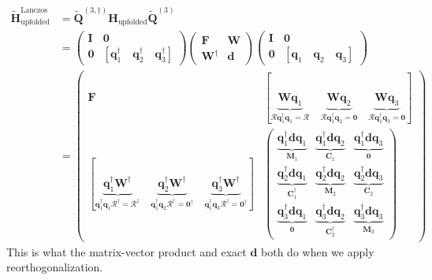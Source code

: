 \begin{align}
    \bm{\tilde{H}}_{\text{upfolded}}^{\text{Lanczos Iter 3}} &= \bm{\tilde{Q}}^{(3,\dagger)} \bm{H}_{\text{upfolded}} \bm{\tilde{Q}}^{(3)}\\
    &= \begin{pmatrix}
        \bm{I} & \bm{0} \\
        \bm{0} & [\bm{q}_1^{\dag}\quad \bm{q}_2^{\dag} \quad \bm{q}_3^{\dag}]
    \end{pmatrix}
    \begin{pmatrix}
        \bm{F} & \bm{W}\\
        \bm{W}^{\dagger} & \bm{d}
    \end{pmatrix}
    \begin{pmatrix}
        \bm{I} & \bm{0} \\
        \bm{0} & [\bm{q}_1\quad \bm{q}_2 \quad \bm{q}_3]
    \end{pmatrix}\\
    &= \begin{pmatrix}
        \bm{F} & [\underbrace{\bm{W}\bm{q}_1}_{\bm{\mathcal{R}}\bm{q}_1^{\dag}\bm{q}_1=\bm{\mathcal{R}}} \quad \underbrace{\bm{W}\bm{q}_2}_{\bm{\mathcal{R}}\bm{q}_1^{\dag}\bm{q}_2=\bm{0}} \quad \underbrace{\bm{W}\bm{q}_3}_{\bm{\mathcal{R}}\bm{q}_1^{\dag}\bm{q}_3=\bm{0}}] \\
        [\underbrace{\bm{q}_1^{\dag}\bm{W}^{\dagger}}_{\bm{q}_1^{\dagger}\bm{q}_1\bm{\mathcal{R}}^{\dagger}= \bm{\mathcal{R}}^{\dagger}}\quad \underbrace{\bm{q}_2^{\dag}\bm{W}^{\dagger}}_{\bm{q}_1^{\dagger}\bm{q}_2\bm{\mathcal{R}}^{\dagger}= \bm{0}^{\dagger}} \quad \underbrace{\bm{q}_3^{\dag}\bm{W}^{\dagger}}_{\bm{q}_1^{\dagger}\bm{q}_3\bm{\mathcal{R}}^{\dagger}= \bm{0}^{\dagger}}] 
& \begin{pmatrix}
            \underbrace{\bm{q}_1^{\dag}\bm{d}\bm{q}_1}_{\bm{M}_1} & \underbrace{\bm{q}_1^{\dag}\bm{d}\bm{q}_2}_{\bm{C}_1} & \underbrace{\bm{q}_1^{\dag}\bm{d}\bm{q}_3}_{\bm{0}}\\
            \underbrace{\bm{q}_2^{\dag}\bm{d}\bm{q}_1}_{\bm{C}_1^{\dagger}} & \underbrace{\bm{q}_2^{\dag}\bm{d}\bm{q}_2}_{\bm{M}_2} & \underbrace{\bm{q}_2^{\dag}\bm{d}\bm{q}_3}_{\bm{C}_2}\\
            \underbrace{\bm{q}_3^{\dag}\bm{d}\bm{q}_1}_{\bm{0}} & \underbrace{\bm{q}_3^{\dag}\bm{d}\bm{q}_2}_{\bm{C}_2^{\dag}} & \underbrace{\bm{q}_3^{\dag}\bm{d}\bm{q}_3}_{\bm{M}_3}
        \end{pmatrix}
    \end{pmatrix}
    \label{eqn:lanczos_projection}
\end{align}
This is what the matrix-vector product and exact $\bm{d}$ both do when we apply reorthogonalization.
